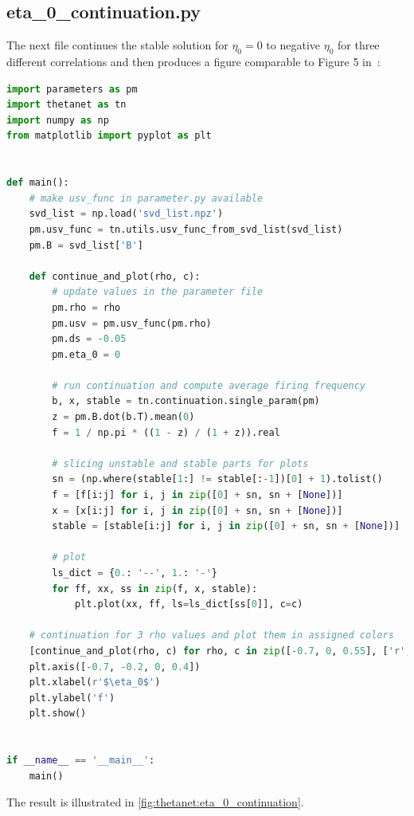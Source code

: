 \documentclass[bibliography=totoc, twoside]{article}
\numberwithin{equation}{section}
\begin{document}
\subsection*{eta\_0\_continuation.py}
The next file continues the stable solution for $\eta_0=0$ to negative $\eta_0$ for three different correlations and then produces a figure comparable to Figure 5 in~\cite{laing2019}:
\begin{lstlisting}[language=python]
import parameters as pm
import thetanet as tn
import numpy as np
from matplotlib import pyplot as plt


def main():
    # make usv_func in parameter.py available
    svd_list = np.load('svd_list.npz')
    pm.usv_func = tn.utils.usv_func_from_svd_list(svd_list)
    pm.B = svd_list['B']

    def continue_and_plot(rho, c):
        # update values in the parameter file
        pm.rho = rho
        pm.usv = pm.usv_func(pm.rho)
        pm.ds = -0.05
        pm.eta_0 = 0

        # run continuation and compute average firing frequency
        b, x, stable = tn.continuation.single_param(pm)
        z = pm.B.dot(b.T).mean(0)
        f = 1 / np.pi * ((1 - z) / (1 + z)).real

        # slicing unstable and stable parts for plots
        sn = (np.where(stable[1:] != stable[:-1])[0] + 1).tolist()
        f = [f[i:j] for i, j in zip([0] + sn, sn + [None])]
        x = [x[i:j] for i, j in zip([0] + sn, sn + [None])]
        stable = [stable[i:j] for i, j in zip([0] + sn, sn + [None])]

        # plot
        ls_dict = {0.: '--', 1.: '-'}
        for ff, xx, ss in zip(f, x, stable):
            plt.plot(xx, ff, ls=ls_dict[ss[0]], c=c)

    # continuation for 3 rho values and plot them in assigned colors
    [continue_and_plot(rho, c) for rho, c in zip([-0.7, 0, 0.55], ['r', 'k', 'b'])]
    plt.axis([-0.7, -0.2, 0, 0.4])
    plt.xlabel(r'$\eta_0$')
    plt.ylabel('f')
    plt.show()


if __name__ == '__main__':
    main()
\end{lstlisting}
The result is illustrated in \autoref{fig:thetanet:eta_0_continuation}.
\end{document}
